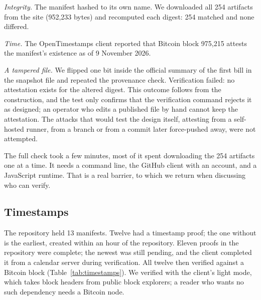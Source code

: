\emph{Integrity.} The manifest hashed to its own name. We downloaded all 254 artifacts from the site (952,233 bytes) and recomputed each digest: 254 matched and none differed.

\emph{Time.} The OpenTimestamps client reported that Bitcoin block 975,215 attests the manifest's existence as of 9 November 2026.

\emph{A tampered file.} We flipped one bit inside the official summary of the first bill in the snapshot file and repeated the provenance check. Verification failed: no attestation exists for the altered digest. This outcome follows from the construction, and the test only confirms that the verification command rejects it as designed; an operator who edits a published file by hand cannot keep the attestation. The attacks that would test the design itself, attesting from a self-hosted runner, from a branch or from a commit later force-pushed away, were not attempted.

The full check took a few minutes, most of it spent downloading the 254 artifacts one at a time. It needs a command line, the GitHub client with an account, and a JavaScript runtime. That is a real barrier, to which we return when discussing who can verify.

\subsection{Timestamps}
\label{sec:eval-time}

The repository held 13 manifests. Twelve had a timestamp proof; the one without is the earliest, created within an hour of the repository. Eleven proofs in the repository were complete; the newest was still pending, and the client completed it from a calendar server during verification. All twelve then verified against a Bitcoin block (Table~\ref{tab:timestamps}). We verified with the client's light mode, which takes block headers from public block explorers; a reader who wants no such dependency needs a Bitcoin node.

